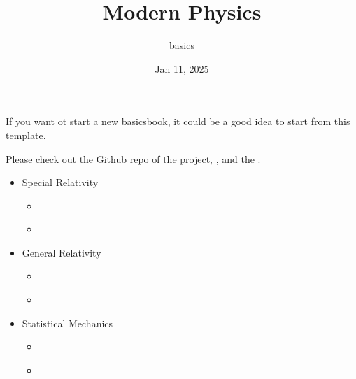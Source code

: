 \documentclass[letterpaper,10pt,english]{jupyterBook}
\title{Modern Physics}
\date{Jan 11, 2025}
\author{basics}
\begin{document}
\pagestyle{empty}
\sphinxmaketitle
\pagestyle{plain}
\sphinxtableofcontents
\pagestyle{normal}
\label{\detokenize{intro::doc}}


\sphinxAtStartPar
If you want ot start a new basics\sphinxhyphen{}book, it could be a good idea to start from this template.

\sphinxAtStartPar
Please check out the Github repo of the project, , and the .
\begin{itemize}
\item {} 
\sphinxAtStartPar
Special Relativity

\begin{itemize}
\item {} 
\sphinxAtStartPar
{\hyperref[\detokenize{ch/relativity-special/intro::doc}]{}}

\item {} 
\sphinxAtStartPar
{\hyperref[\detokenize{ch/relativity-special/notes::doc}]{}}

\end{itemize}
\end{itemize}
\begin{itemize}
\item {} 
\sphinxAtStartPar
General Relativity

\begin{itemize}
\item {} 
\sphinxAtStartPar
{\hyperref[\detokenize{ch/relativity-general/intro::doc}]{}}

\item {} 
\sphinxAtStartPar
{\hyperref[\detokenize{ch/relativity-general/notes::doc}]{}}

\end{itemize}
\end{itemize}
\begin{itemize}
\item {} 
\sphinxAtStartPar
Statistical Mechanics

\begin{itemize}
\item {} 
\sphinxAtStartPar
{\hyperref[\detokenize{ch/statistical-mechanics/intro::doc}]{}}

\item {} 
\sphinxAtStartPar
{\hyperref[\detokenize{ch/statistical-mechanics/notes::doc}]{}}

\end{itemize}
\end{itemize}
\end{document}
